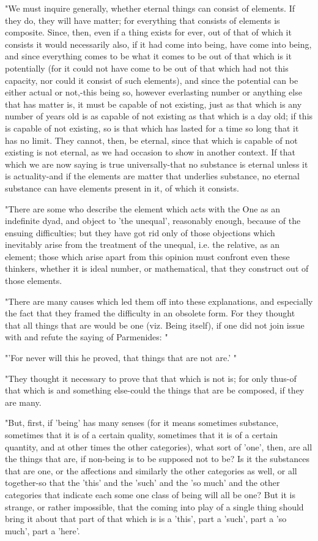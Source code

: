 "We must inquire generally, whether eternal things can consist of
elements. If they do, they will have matter; for everything that consists
of elements is composite. Since, then, even if a thing exists for
ever, out of that of which it consists it would necessarily also,
if it had come into being, have come into being, and since everything
comes to be what it comes to be out of that which is it potentially
(for it could not have come to be out of that which had not this capacity,
nor could it consist of such elements), and since the potential can
be either actual or not,-this being so, however everlasting number
or anything else that has matter is, it must be capable of not existing,
just as that which is any number of years old is as capable of not
existing as that which is a day old; if this is capable of not existing,
so is that which has lasted for a time so long that it has no limit.
They cannot, then, be eternal, since that which is capable of not
existing is not eternal, as we had occasion to show in another context.
If that which we are now saying is true universally-that no substance
is eternal unless it is actuality-and if the elements are matter that
underlies substance, no eternal substance can have elements present
in it, of which it consists. 

"There are some who describe the element which acts with the One as
an indefinite dyad, and object to 'the unequal', reasonably enough,
because of the ensuing difficulties; but they have got rid only of
those objections which inevitably arise from the treatment of the
unequal, i.e. the relative, as an element; those which arise apart
from this opinion must confront even these thinkers, whether it is
ideal number, or mathematical, that they construct out of those elements.

"There are many causes which led them off into these explanations,
and especially the fact that they framed the difficulty in an obsolete
form. For they thought that all things that are would be one (viz.
Being itself), if one did not join issue with and refute the saying
of Parmenides: "

"'For never will this he proved, that things that are not are.'
"

"They thought it necessary to prove that that which is not is; for
only thus-of that which is and something else-could the things that
are be composed, if they are many. 

"But, first, if 'being' has many senses (for it means sometimes substance,
sometimes that it is of a certain quality, sometimes that it is of
a certain quantity, and at other times the other categories), what
sort of 'one', then, are all the things that are, if non-being is
to be supposed not to be? Is it the substances that are one, or the
affections and similarly the other categories as well, or all together-so
that the 'this' and the 'such' and the 'so much' and the other categories
that indicate each some one class of being will all be one? But it
is strange, or rather impossible, that the coming into play of a single
thing should bring it about that part of that which is is a 'this',
part a 'such', part a 'so much', part a 'here'. 

